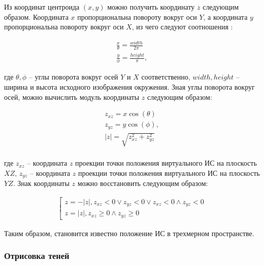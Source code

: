 Из координат центроида $(x, y)$ можно получить координату $z$ следующим образом. Координата $x$ пропорциональна повороту вокруг оси $Y$, а координата $y$ пропорциональна повороту вокруг оси $X$, из чего следуют соотношения \cite{osti2019real}:

\begin{equation}
	\begin{split}
		\frac{x}{\theta} = \frac{width}{2\pi} \\
		\frac{y}{\phi} = \frac{height}{\pi},
	\end{split}
\end{equation}

где $\theta, \phi$ -- углы поворота вокруг осей $Y$ и $X$ соответственно, $width, height$ -- ширина и высота исходного изображения окружения. Зная углы поворота вокруг осей, можно вычислить модуль координаты $z$ следующим образом:

\begin{equation}
	\begin{split}
		z_{xz} = x\cos(\theta) \\
		z_{yz} = y\cos(\phi), \\
		|z| = \sqrt{z_{xz} ^ 2 + z_{yz} ^ 2} \\
	\end{split}
\end{equation}

где $z_{xz}$ -- координата $z$ проекции точки положения виртуального ИС на плоскость $XZ$, $z_{yz}$ -- координата $z$ проекции точки положения виртуального ИС на плоскость $YZ$. Знак координаты $z$ можно восстановить следующим образом:

\begin{equation}
	\begin{split}
		\left[
		\begin{gathered}
			z = -|z|, z_{xz} < 0 \vee z_{yz} < 0 \vee z_{xz} < 0 \wedge z_{yz} < 0 \\
			z = |z|, z_{xz} \geq 0 \wedge z_{yz} \geq 0
		\end{gathered}
		\right.
	\end{split}
\end{equation}

Таким образом, становится известно положение ИС в трехмерном пространстве.

\subsubsection*{Отрисовка теней}

